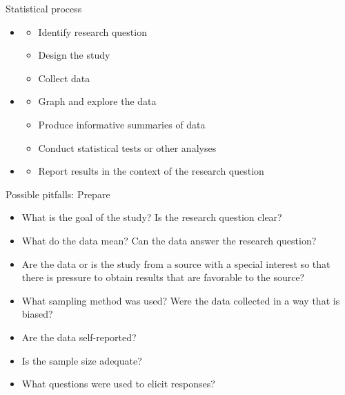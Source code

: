 \documentclass[xcolor=table, aspectratio=169, bigger, handout]{beamer}
\begin{document}
\begin{frame}{Statistical process}
\begin{block}{}
\begin{itemize}
\item<1-> 
\begin{itemize}
\item<2-> Identify research question
\item<2-> Design the study
\item<2-> Collect data
\end{itemize}
\item<1-> 
\begin{itemize}
\item<3-> Graph and explore the data
\item<3-> Produce informative summaries of data
\item<3-> Conduct statistical tests or other analyses
\end{itemize}
\item<1-> 
\begin{itemize}
\item<4-> Report results in the context of the research question
\end{itemize}
\end{itemize}
\end{block}

\end{frame}


\begin{frame}{Possible pitfalls: Prepare}
\begin{block}{}
\begin{itemize}
\item What is the goal of the study? Is the research question clear?
\item What do the data mean? Can the data answer the research question?
\item Are the data or is the study from a source with a special interest so that there is pressure to obtain results that are favorable to the source?
\item What sampling method was used? Were the data collected in a way that is biased?
\item Are the data self-reported?
\item Is the sample size adequate?
\item What questions were used to elicit responses?
\end{itemize}
\end{block}
\end{frame}
\end{document}
